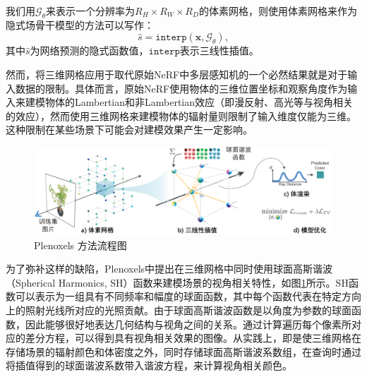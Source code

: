 我们用$\mathcal{G}_\theta$来表示一个分辨率为$R_H\times R_W\times R_D$的体素网格，则使用体素网格来作为隐式场骨干模型的方法可以写作：
\begin{equation}
    \hat{s} = \mathtt{interp}(\mathbf{x}, \mathcal{G}_\theta),
\end{equation}
其中$\hat{s}$为网络预测的隐式函数值，$\mathtt{interp}$表示三线性插值。

然而，将三维网格应用于取代原始NeRF中多层感知机的一个必然结果就是对于输入数据的限制。具体而言，原始NeRF使用物体的三维位置坐标和观察角度作为输入来建模物体的Lambertian和非Lambertian效应（即漫反射、高光等与视角相关的效应），然而使用三维网格来建模物体的辐射量则限制了输入维度仅能为三维。这种限制在某些场景下可能会对建模效果产生一定影响。

\begin{figure}[ht]
    \centering
    \includegraphics[width=\textwidth]{undergraduate-thesis/images/related-work/plenoxels.pdf}
    \caption{Plenoxels 方法流程图}
    \label{fig:related-work plenoxels pipeline}
\end{figure}

为了弥补这样的缺陷，Plenoxels\cite{fridovich-keil_plenoxels_2022}中提出在三维网格中同时使用球面高斯谐波（Spherical Harmonics, SH）函数来建模场景的视角相关特性，如图\ref{fig:related-work plenoxels pipeline}所示。SH函数可以表示为一组具有不同频率和幅度的球面函数，其中每个函数代表在特定方向上的照射光线所对应的光照贡献。由于球面高斯谐波函数是以角度为参数的球面函数，因此能够很好地表达几何结构与视角之间的关系。通过计算遍历每个像素所对应的差分方程，可以得到具有视角相关效果的图像。从实践上，即是使三维网格在存储场景的辐射颜色和体密度之外，同时存储球面高斯谐波系数组，在查询时通过将插值得到的球面谐波系数带入谐波方程，来计算视角相关颜色。 

